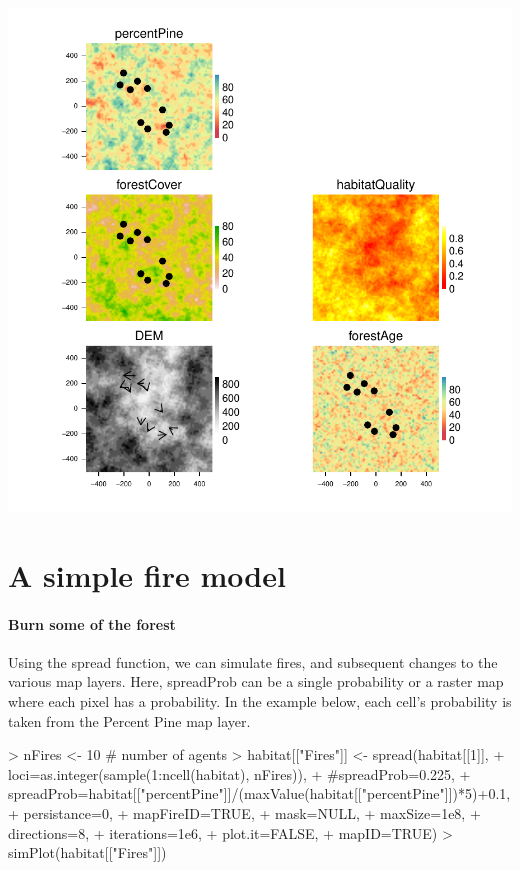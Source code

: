 \documentclass{article}
\begin{document}
\includegraphics{introduction-mobile-point-agent}

\section{A simple fire model}
\paragraph{Burn some of the forest}
Using the spread function, we can simulate fires, and subsequent changes to the various map layers. Here, spreadProb can be a single probability or a raster map where each pixel has a probability. In the example below, each cell's probability is taken from the Percent Pine map layer.

\begin{Schunk}
\begin{Sinput}
> nFires <- 10 # number of agents
> habitat[["Fires"]] <- spread(habitat[[1]],
+                              loci=as.integer(sample(1:ncell(habitat), nFires)),
+                              #spreadProb=0.225,
+                              spreadProb=habitat[["percentPine"]]/(maxValue(habitat[["percentPine"]])*5)+0.1,
+                              persistance=0,
+                              mapFireID=TRUE,
+                              mask=NULL,
+                              maxSize=1e8,
+                              directions=8,
+                              iterations=1e6,
+                              plot.it=FALSE,
+                              mapID=TRUE)
> simPlot(habitat[["Fires"]])
\end{Sinput}
\end{Schunk}
\end{document}
